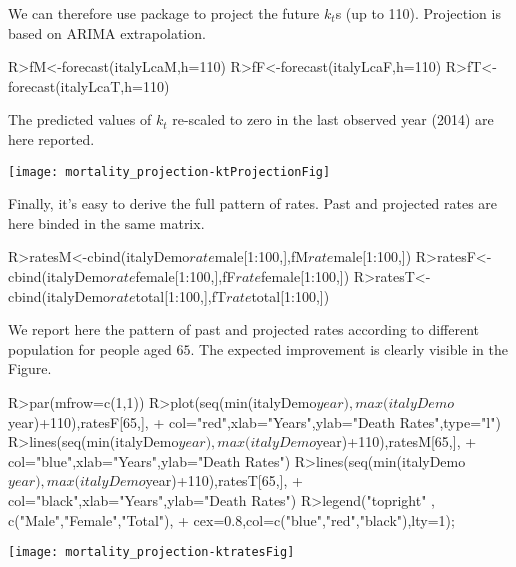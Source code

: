 \documentclass[nojss]{jss}
\begin{document}
We can therefore use  package to project the future $k_{t}$s (up to 110). Projection is based on ARIMA extrapolation.

\begin{Schunk}
\begin{Sinput}
R>fM<-forecast(italyLcaM,h=110)
R>fF<-forecast(italyLcaF,h=110)
R>fT<-forecast(italyLcaT,h=110)
\end{Sinput}
\end{Schunk}

The predicted values of $k_{t}$ re-scaled to zero in the last observed year (2014) are here reported.

\begin{Schunk}
\end{Schunk}
\texttt{[image: mortality\_projection-ktProjectionFig]}

Finally, it's easy to derive the full pattern of rates. Past and projected rates are here binded in the same matrix.

\begin{Schunk}
\begin{Sinput}
R>ratesM<-cbind(italyDemo$rate$male[1:100,],fM$rate$male[1:100,])
R>ratesF<-cbind(italyDemo$rate$female[1:100,],fF$rate$female[1:100,])
R>ratesT<-cbind(italyDemo$rate$total[1:100,],fT$rate$total[1:100,])
\end{Sinput}
\end{Schunk}
We report here the pattern of past and projected rates according to different population for people aged $65$. The expected improvement is clearly visible in the Figure.

\begin{Schunk}
\begin{Sinput}
R>par(mfrow=c(1,1))
R>plot(seq(min(italyDemo$year),max(italyDemo$year)+110),ratesF[65,],
+      col="red",xlab="Years",ylab="Death Rates",type="l")
R>lines(seq(min(italyDemo$year),max(italyDemo$year)+110),ratesM[65,],
+       col="blue",xlab="Years",ylab="Death Rates")
R>lines(seq(min(italyDemo$year),max(italyDemo$year)+110),ratesT[65,],
+       col="black",xlab="Years",ylab="Death Rates")
R>legend("topright" , c("Male","Female","Total"),
+        cex=0.8,col=c("blue","red","black"),lty=1);
\end{Sinput}
\end{Schunk}
\texttt{[image: mortality\_projection-ktratesFig]}
\end{document}
